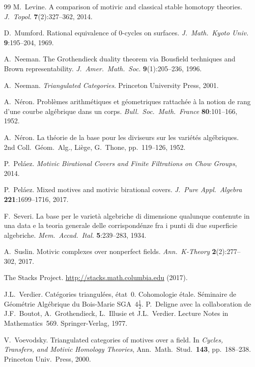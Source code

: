 \documentclass[12pt,a4paper]{article}
\theoremstyle{definition}
\begin{document}
\begin{thebibliography}{99}
M.\ Levine. A comparison of motivic and classical stable homotopy theories.
\textit{J.\ Topol.} \textbf{7}(2):327--362, 2014.

D.\ Mumford. Rational equivalence of 0-cycles on surfaces.
\textit{J.\ Math.\ Kyoto Univ.} \textbf{9}:195--204, 1969.

A.\ Neeman. The Grothendieck duality theorem via Bousfield techniques and Brown
representability. \textit{J.\ Amer.\ Math.\ Soc.} \textbf{9}(1):205--236, 1996.

A.\ Neeman. \textit{Triangulated Categories}. Princeton University Press, 2001.

A.\ Néron. Problèmes arithmétiques et géometriques rattachée à la notion de rang
d'une courbe algébrique dans un corps. \textit{Bull.\ Soc.\ Math.\ France}
\textbf{80}:101--166, 1952.

A.\ Néron. La théorie de la base pour les diviseurs sur les variétés algébriques.
2nd Coll.\ Géom.\ Alg., Liège, G.\ Thone, pp.\ 119--126, 1952.

P.\ Peláez. \textit{Motivic Birational Covers and Finite Filtrations on Chow
Groups}, 2014.

P.\ Peláez. Mixed motives and motivic birational covers.
\textit{J.\ Pure Appl.\ Algebra} \textbf{221}:1699--1716, 2017.

F.\ Severi. La base per le varietà algebriche di dimensione qualunque contenute in
una data e la teoria generale delle corrispondénze fra i punti di due superficie
algebriche. \textit{Mem.\ Accad.\ Ital.} \textbf{5}:239--283, 1934.

A.\ Suslin. Motivic complexes over nonperfect fields.
\textit{Ann.\ K-Theory} \textbf{2}(2):277--302, 2017.

The Stacks Project. \url{http://stacks.math.columbia.edu} (2017).

J.L.\ Verdier. Catégories triangulées, état~0. Cohomologie étale. Séminaire de
Géométrie Algébrique du Bois-Marie SGA~$4\tfrac{1}{2}$. P.\ Deligne avec la
collaboration de J.F.\ Boutot, A.\ Grothendieck, L.\ Illusie et J.L.\ Verdier.
Lecture Notes in Mathematics~569. Springer-Verlag, 1977.

V.\ Voevodsky. Triangulated categories of motives over a field. In
\textit{Cycles, Transfers, and Motivic Homology Theories}, Ann.\ Math.\ Stud.\
\textbf{143}, pp.\ 188--238. Princeton Univ.\ Press, 2000.


\end{thebibliography}
\end{document}
